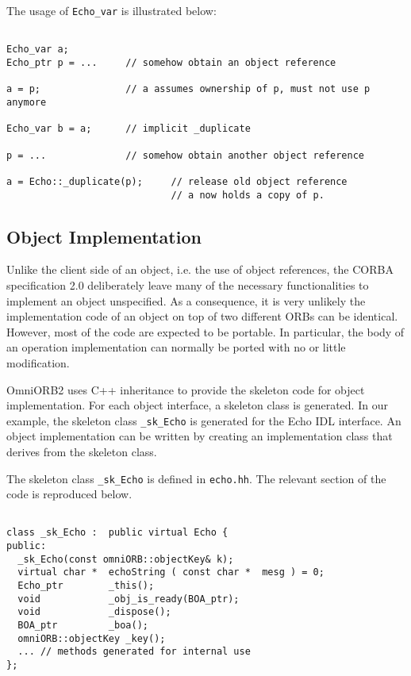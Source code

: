 \documentclass[11pt,twoside,onecolumn]{book}
\begin{document}
The usage of {\tt Echo\_var} is illustrated below:

{\small
\begin{verbatim}

Echo_var a;
Echo_ptr p = ...     // somehow obtain an object reference

a = p;               // a assumes ownership of p, must not use p anymore

Echo_var b = a;      // implicit _duplicate

p = ...              // somehow obtain another object reference

a = Echo::_duplicate(p);     // release old object reference
                             // a now holds a copy of p.
\end{verbatim}
}

\subsection{Object Implementation}
\label{stubobjimpl}

Unlike the client side of an object, i.e. the use of object references, the
CORBA specification 2.0 deliberately leave many of the necessary
functionalities to implement an object unspecified. As a consequence, it is
very unlikely the implementation code of an object on top of two different
ORBs can be identical. However, most of the code are expected to be
portable. In particular, the body of an operation implementation can
normally be ported with no or little modification.

OmniORB2 uses C++ inheritance to provide the skeleton code for 
object implementation. For each object interface, a skeleton class is
generated. In our example, the skeleton class {\tt \_sk\_Echo} is generated for
the Echo IDL interface. An object implementation can be written by creating
an implementation class that derives from the skeleton class. 

The skeleton class {\tt \_sk\_Echo} is defined in {\tt echo.hh}. The
relevant section of the code is reproduced below. 

{\small
\begin{verbatim}

class _sk_Echo :  public virtual Echo {
public:
  _sk_Echo(const omniORB::objectKey& k);
  virtual char *  echoString ( const char *  mesg ) = 0;
  Echo_ptr        _this();
  void            _obj_is_ready(BOA_ptr);
  void            _dispose();
  BOA_ptr         _boa();
  omniORB::objectKey _key();  
  ... // methods generated for internal use
};

\end{verbatim}
}
\end{document}
